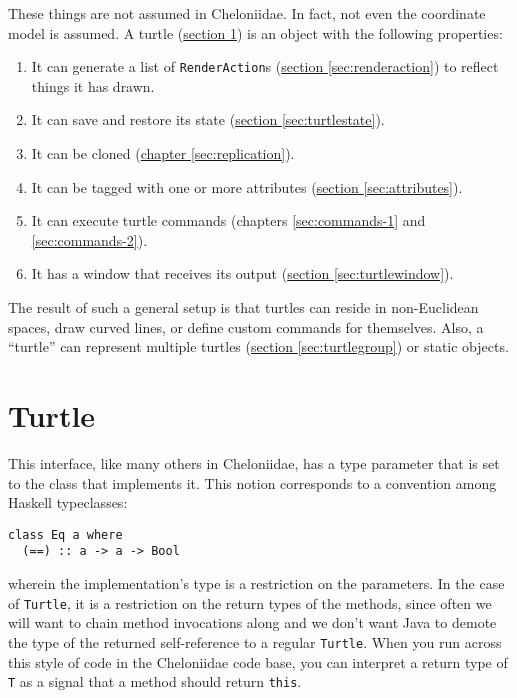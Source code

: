 \documentclass{report}
\newcommand{\Ref}[2]{\hyperref[#2]{#1 \ref*{#2}}}
\begin{document}
    These things are not assumed in Cheloniidae. In fact, not even the coordinate model is assumed. A turtle (\Ref{section}{sec:turtle}) is an object with the
    following properties:

\begin{enumerate}
\item It can generate a list of {\tt RenderAction}s (\Ref{section}{sec:renderaction}) to reflect things it has drawn.
\item It can save and restore its state (\Ref{section}{sec:turtlestate}).
\item It can be cloned (\Ref{chapter}{sec:replication}).
\item It can be tagged with one or more attributes (\Ref{section}{sec:attributes}).
\item It can execute turtle commands (chapters \ref{sec:commands-1} and \ref{sec:commands-2}).
\item It has a window that receives its output (\Ref{section}{sec:turtlewindow}).
\end{enumerate}

    The result of such a general setup is that turtles can reside in non-Euclidean spaces, draw curved lines, or define custom commands for themselves. Also, a
    ``turtle'' can represent multiple turtles (\Ref{section}{sec:turtlegroup}) or static objects.

\section {Turtle} \label{sec:turtle}
      This interface, like many others in Cheloniidae, has a type parameter that is set to the class that implements it. This notion corresponds to a convention
      among Haskell typeclasses:

\begin{verbatim}
class Eq a where
  (==) :: a -> a -> Bool
\end{verbatim}

      \noindent wherein the implementation's type is a restriction on the parameters. In the case of {\tt Turtle}, it is a restriction on the return types of
      the methods, since often we will want to chain method invocations along and we don't want Java to demote the type of the returned self-reference to a
      regular {\tt Turtle}. When you run across this style of code in the Cheloniidae code base, you can interpret a return type of {\tt T} as a signal that a
      method should return {\tt this}.
\end{document}
